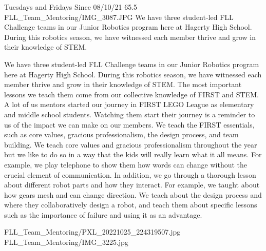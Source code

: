 {Tuesdays and Fridays Since 08/10/21}
{65.5}
{FLL_Team_Mentoring/IMG_3087.JPG}
{We have three student-led FLL Challenge teams in our Junior Robotics program here at Hagerty High School. During this robotics season, we have witnessed each member thrive and grow in their knowledge of STEM.}
{We have three student-led FLL Challenge teams in our Junior Robotics program here at Hagerty High School. During this robotics season, we have witnessed each member thrive and grow in their knowledge of STEM. The most important lessons we teach them come from our collective knowledge of FIRST and STEM. A lot of us mentors started our journey in FIRST LEGO League as elementary and middle school students. Watching them start their journey is a reminder to us of the impact we can make on our members. We teach the FIRST essentials, such as core values, gracious professionalism, the design process, and team building. We teach core values and gracious professionalism throughout the year but we like to do so in a way that the kids will really learn what it all means. For example, we play telephone to show them how words can change without the crucial element of communication. In addition, we go through a thorough lesson about different robot parts and how they interact. For example, we taught about how gears mesh and can change direction. We teach about the design process and where they collaboratively design a robot, and teach them about specific lessons such as the importance of failure and using it as an advantage.  

} 
{FLL_Team_Mentoring/PXL_20221025_224319507.jpg}
{FLL_Team_Mentoring/IMG_3225.jpg}
